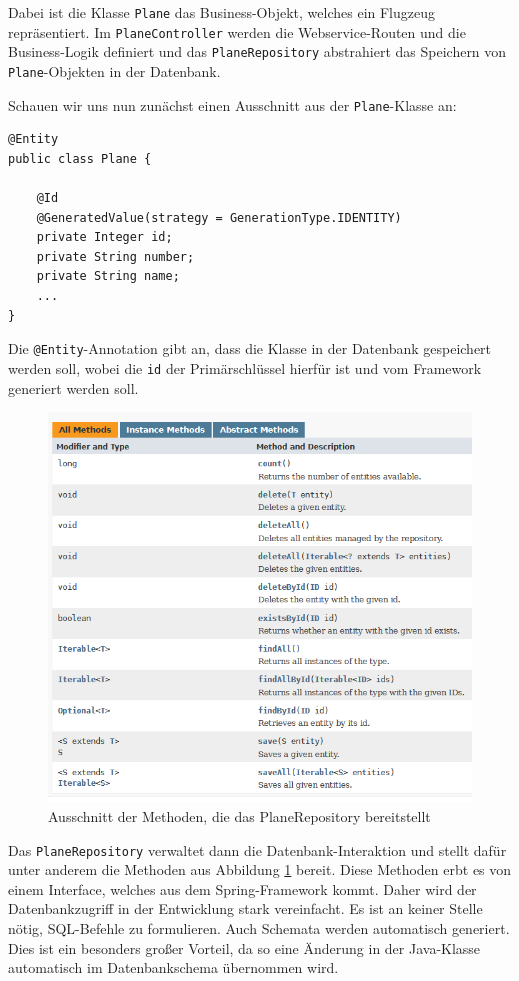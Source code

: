\documentclass[a4paper, 11pt]{article}
\begin{document}
Dabei ist die Klasse \texttt{Plane} das Business-Objekt, welches ein Flugzeug
repräsentiert. Im \texttt{PlaneController} werden die Webservice-Routen und die
Business-Logik definiert und das \texttt{PlaneRepository} abstrahiert das
Speichern von \texttt{Plane}-Objekten in der Datenbank.

Schauen wir uns nun zunächst einen Ausschnitt aus der \texttt{Plane}-Klasse an:

\begin{lstlisting}
@Entity
public class Plane {

    @Id
    @GeneratedValue(strategy = GenerationType.IDENTITY)
    private Integer id;
    private String number;
    private String name;
    ...
}
\end{lstlisting}

Die \lstinline{@Entity}-Annotation gibt an, dass die Klasse in der Datenbank
gespeichert werden soll, wobei die \lstinline{id} der Primärschlüssel hierfür
ist und vom Framework generiert werden soll.

\begin{figure}[htpb]
    \centering
    \includegraphics[width=\textwidth]{images/crudrepository.png}
    \caption{Ausschnitt der Methoden, die das PlaneRepository bereitstellt}
    \label{fig:crudrepository}
\end{figure}

Das \texttt{PlaneRepository} verwaltet dann die Datenbank-Interaktion und
stellt dafür unter anderem die Methoden aus Abbildung \ref{fig:crudrepository}
bereit. Diese Methoden erbt es von einem Interface, welches aus dem
Spring-Framework kommt. Daher wird der Datenbankzugriff in der Entwicklung
stark vereinfacht. Es ist an keiner Stelle nötig, SQL-Befehle zu formulieren.
Auch Schemata werden automatisch generiert. Dies ist ein besonders großer
Vorteil, da so eine Änderung in der Java-Klasse automatisch im Datenbankschema
übernommen wird. 
\end{document}
